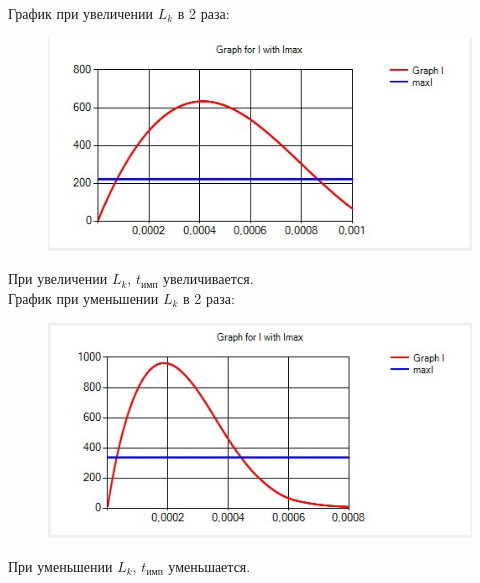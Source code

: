 \documentclass[14pt, a4paper]{extarticle}
\begin{document}
\begin{enumerate}
	График при увеличении $L_k$ в 2 раза:
	\begin{figure}[h]
		\centering
		\includegraphics[scale=1]{source/test4.4.jpg}
	\end{figure}\par
	При увеличении $L_k$, $t_{\text{имп}}$ увеличивается.\\
	\newpage
	График при уменьшении $L_k$ в 2 раза:
	\begin{figure}[h]
		\centering
		\includegraphics[scale=1]{source/test4.5.jpg}
	\end{figure}\par
	При уменьшении $L_k$, $t_{\text{имп}}$ уменьшается.\\
	

\end{enumerate}
\end{document}
